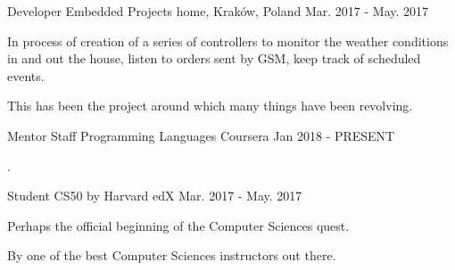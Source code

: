 

\begin{cventries}

\cventry
	{Developer} %
	{Embedded Projects} %
	{home, Kraków, Poland} %
	{Mar. 2017 - May. 2017} %
	{
		\begin{cvitems} %
			\item {In process of creation of a series of controllers to monitor the weather conditions in and out the house, listen to orders sent by GSM, keep track of scheduled events.}
			\item {This has been the project around which many things have been revolving.}
		\end{cvitems}
	}

  \cventry
    {Mentor Staff} %
    {Programming Languages} %
    {Coursera} %
    {Jan 2018 - PRESENT} %
    {
      \begin{cvitems} %
        \item {.}
      \end{cvitems}
    }

  \cventry
    {Student} %
    {CS50 by Harvard} %
    {edX} %
	{Mar. 2017 - May. 2017} %
    {
      \begin{cvitems} %
        \item {Perhaps the official beginning of the Computer Sciences quest.}
        \item {By one of the best Computer Sciences instructors out there.}
      \end{cvitems}
    }

\end{cventries}
